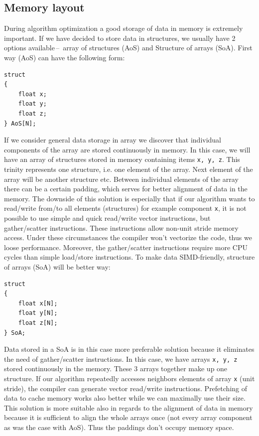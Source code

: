 \subsection{Memory layout}
During algorithm optimization a good storage of data in memory is extremely important. If we have decided to store data in structures, we usually have 2 options available\,--\, array of structures (AoS) and Structure of arrays (SoA). First way (AoS) can have the following form:

\bigskip
\begin{lstlisting}[caption=Array of structures example, captionpos=b, label=AoS]
struct
{
    float x;
    float y;
    float z;
} AoS[N];
\end{lstlisting}
\bigskip

If we consider general data storage in array we discover that individual components of the array are stored continuously in memory. In this case, we will have an array of structures stored in memory containing items \texttt{x, y, z}. This trinity represents one structure, i.e. one element of the array. Next element of the array will be another structure etc. Between individual elements of the array there can be a certain padding, which serves for better alignment of data in the memory. The downside of this solution is especially that if our algorithm wants to read/write from/to all elements (structures) for example component \texttt{x}, it is not possible to use simple and quick read/write vector instructions, but gather/scatter instructions. These instructions allow non-unit stride memory access. Under these circumstances the compiler won't vectorize the code, thus we loose performance. Moreover, the gather/scatter instructions require more CPU cycles than simple load/store instructions. To make data SIMD-friendly, structure of arrays (SoA) will be better way:

\bigskip
\begin{lstlisting}[caption=Structure of arrays example, captionpos=b, label=SoA]
struct
{
    float x[N];
    float y[N];
    float z[N];
} SoA;
\end{lstlisting}
\bigskip

\par Data stored in a SoA is in this case more preferable solution because it eliminates the need of gather/scatter instructions. In this case, we have arrays \texttt{x, y, z} stored continuously in the memory. These 3 arrays together make up one structure. If our algorithm repeatedly accesses neighbors elements of array \texttt{x} (unit stride), the compiler can generate vector read/write instructions. Prefetching of data to cache memory works also better while we can maximally use their size. This solution is more suitable also in regards to the alignment of data in memory because it is sufficient to align the whole arrays once (not every array component as was the case with AoS). Thus the paddings don't occupy memory space.


